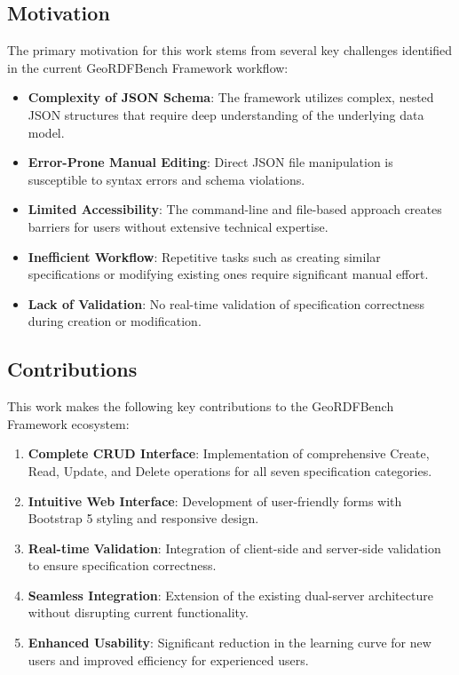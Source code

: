 \documentclass[11pt,a4paper]{article}
\begin{document}
\subsection{Motivation}

The primary motivation for this work stems from several key challenges identified in the current GeoRDFBench Framework workflow:

\begin{itemize}
    \item \textbf{Complexity of JSON Schema}: The framework utilizes complex, nested JSON structures that require deep understanding of the underlying data model.
    \item \textbf{Error-Prone Manual Editing}: Direct JSON file manipulation is susceptible to syntax errors and schema violations.
    \item \textbf{Limited Accessibility}: The command-line and file-based approach creates barriers for users without extensive technical expertise.
    \item \textbf{Inefficient Workflow}: Repetitive tasks such as creating similar specifications or modifying existing ones require significant manual effort.
    \item \textbf{Lack of Validation}: No real-time validation of specification correctness during creation or modification.
\end{itemize}

\subsection{Contributions}

This work makes the following key contributions to the GeoRDFBench Framework ecosystem:

\begin{enumerate}
    \item \textbf{Complete CRUD Interface}: Implementation of comprehensive Create, Read, Update, and Delete operations for all seven specification categories.
    \item \textbf{Intuitive Web Interface}: Development of user-friendly forms with Bootstrap 5 styling and responsive design.
    \item \textbf{Real-time Validation}: Integration of client-side and server-side validation to ensure specification correctness.
    \item \textbf{Seamless Integration}: Extension of the existing dual-server architecture without disrupting current functionality.
    \item \textbf{Enhanced Usability}: Significant reduction in the learning curve for new users and improved efficiency for experienced users.
\end{enumerate}
\end{document}
